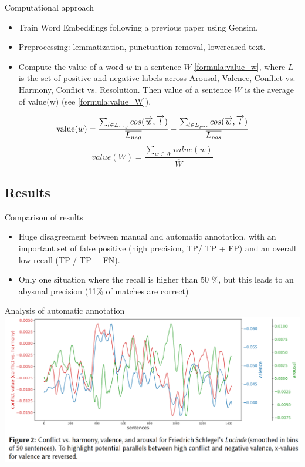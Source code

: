 \documentclass[aspectratio=169]{beamer}
\begin{document}
\begin{frame}{Computational approach}
    \begin{itemize}
        \item Train Word Embeddings following a previous paper using Gensim.
        \item Preprocessing: lemmatization, punctuation removal, lowercased text.
        \item Compute the value of a word $w$ in a sentence $W$ \ref{formula:value_w}, where $L$ is the set of positive and negative labels across Arousal, Valence, Conflict vs. Harmony, Conflict vs. Resolution. Then value of a sentence $W$ is the average of value(w) (see \ref{formula:value_W}).
    \end{itemize}
    \begin{equation}
        \text{value}(w) = \frac{%
            \sum_{l \in L_{neg}}%
            cos(\overrightarrow{w}, \overrightarrow{l})}{\overline{L_{neg}}} - \frac{%
            \sum_{l \in L_{pos}}%
            cos(\overrightarrow{w}, \overrightarrow{l})}{\overline{L_{pos}}}
        \label{formula:value_w}
    \end{equation}
    \begin{equation}
        value(W) = \frac{\sum_{w \in W}value(w)}{\overline{W}}
        \label{formula:value_W}
    \end{equation}
\end{frame}

\subsection{Results}

\begin{frame}{Comparison of results}
    \begin{itemize}
        \item Huge disagreement between manual and automatic annotation, with an important set of false positive (high precision, TP/ TP + FP) and an overall low recall (TP / TP + FN).
        \item Only one situation where the recall is higher than 50 \%, but this leads to an abysmal precision (11\% of matches are correct)
    \end{itemize}
\end{frame}

\begin{frame}{Analysis of automatic annotation}
    \centering
    \includegraphics[width=.9\linewidth]{intro-to-ch/images/plotarousal.png}
\end{frame}
\end{document}
